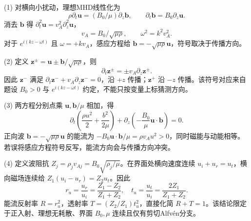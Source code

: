 (1) 对横向小扰动，理想MHD线性化为
\[
\rho\partial_t\boldsymbol u=(B_0/\mu)\partial_z\boldsymbol b,\qquad
\partial_t\boldsymbol b=B_0\partial_z\boldsymbol u.
\]
消去 \(\boldsymbol b\) 得 \(\partial_t^2\boldsymbol u=v_A^2\partial_z^2\boldsymbol u\)，
\[
\boxed{v_A=B_0/\sqrt{\mu\rho},\qquad\omega^2=k^2v_A^2}.
\]
对于 \(e^{i(kz-\omega t)}\) 且 \(\omega=+kv_A\)，感应方程给 \(\boldsymbol b=-\sqrt{\mu\rho}\boldsymbol u\)，符号取决于传播方向。

(2) 定义 \(\boldsymbol z^\pm=\boldsymbol u\pm\boldsymbol b/\sqrt{\mu\rho}\)，则
\[
\partial_t\boldsymbol z^\pm=\pm v_A\partial_z\boldsymbol z^\pm.
\]
因此 \(\boldsymbol z^-\) 满足 \(\partial_t\boldsymbol z^-+v_A\partial_z\boldsymbol z^-=0\)，沿 \(+z\) 传播；\(\boldsymbol z^+\) 沿 \(-z\) 传播。该符号对应来自题设 \(B_0>0\) 与 \(e^{i(kz-\omega t)}\) 约定，不能只按变量上标猜测方向。

(3) 两方程分别点乘 \(\boldsymbol u,\boldsymbol b/\mu\) 相加，得
\[
\boxed{\partial_t\left(\frac{\rho u^2}{2}+\frac{b^2}{2\mu}\right)
+\partial_z\left(-\frac{B_0}{\mu}\boldsymbol u\cdot\boldsymbol b\right)=0}.
\]
正向波 \(\boldsymbol b=-\sqrt{\mu\rho}\boldsymbol u\) 的能流为
\(-B_0\boldsymbol u\cdot\boldsymbol b/\mu=\rho v_Au^2>0\)，同时磁能与动能相等。若误将感应方程符号反写，能流方向会与传播方向冲突。

(4) 定义波阻抗 \(Z_j=\rho_jv_{Aj}=B_0\sqrt{\rho_j/\mu}\)。在界面处横向速度连续 \(u_i+u_r=u_t\)，横向磁场连续给 \(Z_1(u_i-u_r)=Z_2u_t\)。因此
\[
\boxed{r_u=\frac{u_r}{u_i}=\frac{Z_1-Z_2}{Z_1+Z_2},\quad
t_u=\frac{u_t}{u_i}=\frac{2Z_1}{Z_1+Z_2}}.
\]
能流反射率 \(R=r_u^2\)，透射率 \(T=(Z_2/Z_1)t_u^2\)，直接化简 \(R+T=1\)。该结论限定于正入射、理想无耗散、界面 \(B_0,\mu\) 连续且仅有剪切Alfvén分支。
